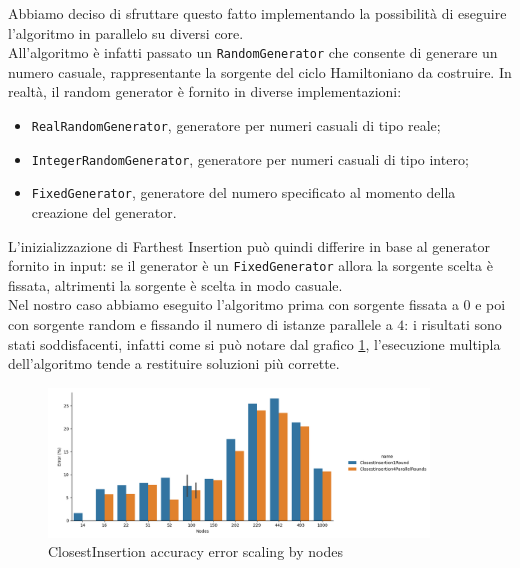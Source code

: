 \noindent Abbiamo deciso di sfruttare questo fatto implementando la
possibilità di eseguire l'algoritmo in parallelo su diversi core.\\

\noindent All'algoritmo è infatti passato un
\texttt{RandomGenerator} che consente di generare un numero
casuale, rappresentante la sorgente del ciclo Hamiltoniano da
costruire. In realtà, il random generator è fornito in diverse
implementazioni:
\begin{itemize}
    \item \texttt{RealRandomGenerator}, generatore per numeri
      casuali di tipo reale;
    \item \texttt{IntegerRandomGenerator}, generatore per
      numeri casuali di tipo intero;
    \item \texttt{FixedGenerator}, generatore del numero
      specificato al momento della creazione del generator.
\end{itemize}
L'inizializzazione di Farthest Insertion può quindi differire in base
al generator fornito in input: se il generator è un
\texttt{FixedGenerator} allora la sorgente scelta è fissata,
altrimenti la sorgente è scelta in modo casuale.\\

\noindent Nel nostro caso abbiamo eseguito l'algoritmo prima con
sorgente fissata a $0$ e poi con sorgente random e fissando il numero
di istanze parallele a $4$: i risultati sono stati soddisfacenti,
infatti come si può notare dal grafico
\ref{fig:farthest-insertion-1-4-rounds-accuracy-error}, l'esecuzione
multipla dell'algoritmo tende a restituire soluzioni più corrette.\\

\begin{figure}[H]
    \centering

    \includegraphics[width=0.9\textwidth]{./images/ClosestInsertion1Round_vs_ClosestInsertion4ParallelRounds__approximation_error_.png}

    \caption{ClosestInsertion accuracy error scaling by nodes}
    \label{fig:farthest-insertion-1-4-rounds-accuracy-error}
\end{figure}

